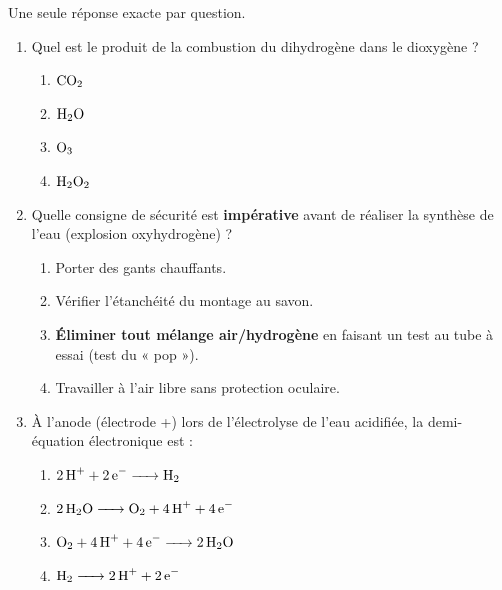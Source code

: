 \documentclass[11pt]{article}
\begin{document}
\begin{exercice}
Une seule réponse exacte par question.
\begin{enumerate}
    \item Quel est le produit de la combustion du dihydrogène dans le dioxygène ?
    \begin{enumerate}
        \item $\ce{CO2}$ \item $\ce{H2O}$ \item $\ce{O3}$ \item $\ce{H2O2}$
    \end{enumerate}
    \item Quelle consigne de sécurité est \textbf{impérative} avant de réaliser la synthèse de l'eau (explosion oxyhydrogène) ?
    \begin{enumerate}
        \item Porter des gants chauffants.
        \item Vérifier l'étanchéité du montage au savon.
        \item \textbf{Éliminer tout mélange air/hydrogène} en faisant un test au tube à essai (test du « pop »).
        \item Travailler à l'air libre sans protection oculaire.
    \end{enumerate}
    \item À l'anode (électrode +) lors de l'électrolyse de l'eau acidifiée, la demi-équation électronique est :
    \begin{enumerate}
        \item $\ce{2 H+ + 2 e- -> H2}$
        \item $\ce{2 H2O -> O2 + 4 H+ + 4 e-}$
        \item $\ce{O2 + 4 H+ + 4 e- -> 2 H2O}$
        \item $\ce{H2 -> 2 H+ + 2 e-}$
    \end{enumerate}
\end{enumerate}
\end{exercice}
\end{document}
